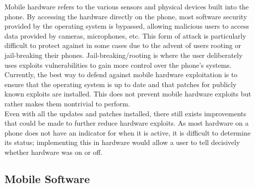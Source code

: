 Mobile hardware refers to the various sensors and physical devices built into the phone. By accessing the hardware directly on the phone, most software security provided by the operating system is bypassed, allowing malicious users to access data provided by cameras, microphones, etc. This form of attack is particularly difficult to protect against in some cases due to the advent of users rooting or jail-breaking their phones.\cite{Reference11} Jail-breaking/rooting is where the user deliberately uses exploits vulnerabilities to gain more control over the phone’s systems.\\
Currently, the best way to defend against mobile hardware exploitation is to ensure that the operating system is up to date and that patches for publicly known exploits are installed. This does not prevent mobile hardware exploits but rather makes them nontrivial to perform.\cite{Reference12}\\
Even with all the updates and patches installed, there still exists improvements that could be made to further reduce hardware exploits. As most hardware on a phone does not have an indicator for when it is active, it is difficult to determine its status; implementing this in hardware would allow a user to tell decisively whether hardware was on or off.\cite{Reference13}


\subsection{Mobile Software}

\label{Ch2 Sec2 Sub2}

